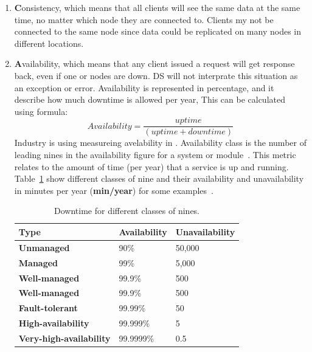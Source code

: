 \begin{enumerate} [start=1,label={(\bfseries \arabic*)}]
	\item \textbf{C}onsistency, which means that all clients will see the same data at the same time, no matter which node they are connected to. Clients my not be connected to the same node since data could be replicated on many nodes in different locations.
	\item \textbf{A}vailability, which means that any client issued a request will get response back, even if one or nodes are down. DS will not interprate this situation as an exception or error. Availability is represented in percentage, and it describe how much downtime is allowed per year, This can be calculated using formula:\\ 
	
	\begin{equation}\label{eq:Availability}
		Availability = \frac{uptime}{ (uptime + downtime)}
	\end{equation}
	Industry is using measureing avelability in . Availability class is the number of leading nines in the availability figure for a system or module~\cite{GrayS91}. This metric relates to the amount of time (per year) that a service is up and running. Table~\ref{tab:table7} show different classes of nine and their availability and unavailability in minutes per year (\textbf{min/year}) for some examples~\cite{GrayS91}.
	
	\begin{table}[h!]
		\begin{center}
			\begin{tabular}{l|l|l}
				\textbf{Type} & \textbf{Availability} & \textbf{Unavailability} \\
				\hline
				\textbf{Unmanaged} & 90\% & 50,000 \\
				\textbf{Managed} & 99\% & 5,000 \\
				\textbf{Well-managed} & 99.9\% & 500 \\
				\textbf{Well-managed} & 99.9\% & 500 \\
				\textbf{Fault-tolerant} & 99.99\% & 50 \\
				\textbf{High-availability} & 99.999\% & 5 \\
				\textbf{Very-high-availability} & 99.9999\% & 0.5 \\
			\end{tabular}
		\end{center}
		\vspace{-0.5cm}
		\caption{Downtime for different classes of nines.}
		\label{tab:table7}
	\end{table}
	

\end{enumerate}
